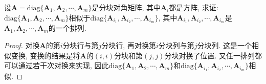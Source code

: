 \documentclass[../../main.tex]{subfiles}%
\begin{document}
\begin{corollary}\label{example6.22}
设\(\boldsymbol{A}=\mathrm{diag}\{\boldsymbol{A}_{1},\boldsymbol{A}_{2},\cdots,\boldsymbol{A}_{m}\}\)是分块对角矩阵, 其中\(\boldsymbol{A}_{i}\)都是方阵, 求证: \(\mathrm{diag}\{\boldsymbol{A}_{1},\boldsymbol{A}_{2},\cdots,\boldsymbol{A}_{m}\}\)相似于\(\mathrm{diag}\{\boldsymbol{A}_{i_{1}},\boldsymbol{A}_{i_{2}},\cdots,\boldsymbol{A}_{i_{m}}\}\), 其中\(\boldsymbol{A}_{i_{1}},\boldsymbol{A}_{i_{2}},\cdots,\boldsymbol{A}_{i_{m}}\)是\(\boldsymbol{A}_{1},\boldsymbol{A}_{2},\cdots,\boldsymbol{A}_{m}\)的一个排列.
\end{corollary}
\begin{proof}

对换\(\boldsymbol{A}\)的第\(i\)分块行与第\(j\)分块行, 再对换第\(i\)分块列与第\(j\)分块列. 这是一个相似变换, 变换的结果是将\(\boldsymbol{A}\)的\((i,i)\)分块和第\((j,j)\)分块对换了位置. 又任一排列都可以通过若干次对换来实现, 因此\(\mathrm{diag}\{\boldsymbol{A}_{1},\boldsymbol{A}_{2},\cdots,\boldsymbol{A}_{m}\}\)和\(\mathrm{diag}\{\boldsymbol{A}_{i_{1}},\boldsymbol{A}_{i_{2}},\cdots,\boldsymbol{A}_{i_{m}}\}\)相似.

\end{proof}
\end{document}
